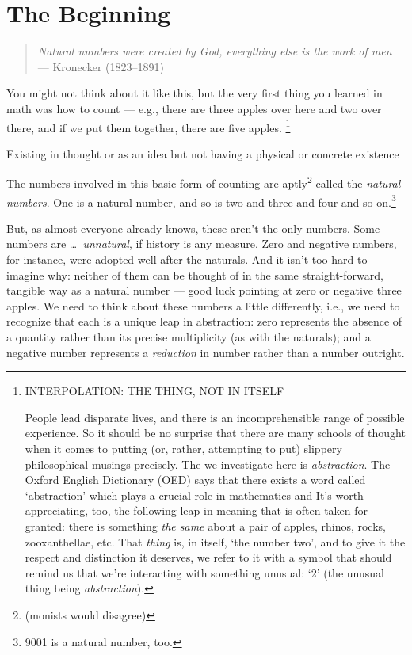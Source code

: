 \documentclass{book}
\theoremstyle{definition}
\theoremstyle{colonstylebf}
\begin{document}
\section{The Beginning}
\begin{quote}
\emph{Natural numbers were created by God, everything else is the work of men} — Kronecker (1823–1891)
\end{quote}
You might not think about it like this, but the very first thing you learned in math was how to count --- e.g., there are three
apples over here and two over there, and if we put them together, there are five apples.
\footnote{
\centerline{INTERPOLATION: THE THING, NOT IN ITSELF} People lead disparate lives, and there is an incomprehensible range of possible experience. So it should be no surprise that there are many schools of thought when it comes to putting (or, rather, attempting to put) slippery philosophical musings precisely. The  we investigate here is \emph{abstraction}. The Oxford English Dictionary (OED) says that   there exists a word called `abstraction' which plays a crucial role in mathematics and  It's worth appreciating, too, the following leap in meaning that is often taken for granted: there is something \emph{the same} about a pair of apples, rhinos, rocks, zooxanthellae, etc. That \emph{thing} is, in itself, `the number two', and to give it the respect and distinction it deserves, we refer to it with a symbol that should remind us that we're interacting with something unusual: `2' (the unusual thing being \emph{abstraction}).}

Existing in thought or as an idea but not having a physical or concrete existence

The numbers involved in this basic form of counting are aptly\footnote{(monists would disagree)} called the \emph{natural numbers}. One is a natural number, and so is two and three and four and so on.\footnote{9001 is a natural number, too.}

But, as almost everyone already knows, these aren't the only numbers. Some numbers are \dots \emph{\ \!unnatural}, if history is any measure. Zero and negative numbers, for instance, were adopted well after the naturals. And it isn't too hard to imagine why: neither of them can be thought of in the same straight-forward, tangible way as a natural number --- good luck pointing at zero or negative three apples. We need to think about these numbers a little differently, i.e., we need to recognize that each is a unique leap in abstraction: zero represents the absence of a quantity rather than its precise multiplicity (as with the naturals); and a negative number represents a {\sl reduction} in number rather than a number outright.  
\end{document}
